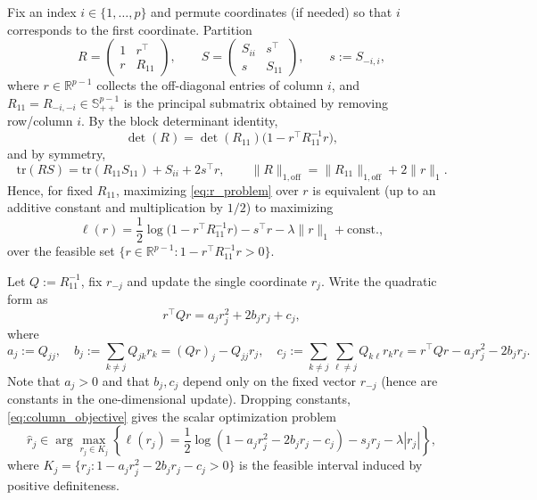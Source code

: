 \documentclass[12pt]{amsart}
\numberwithin{equation}{section}
\numberwithin{equation}{section}
\theoremstyle{plain}
\theoremstyle{definition}
\newcommand{\tr}{\mathrm{tr}}
\newcommand{\R}{\mathbb{R}}
\begin{document}
Fix an index $i\in\{1,\dots,p\}$ and permute coordinates (if needed) so that $i$ corresponds to the first coordinate.
Partition
\[
R=\begin{pmatrix}1 & r^\top\\ r & R_{11}\end{pmatrix},\qquad
S=\begin{pmatrix}S_{ii} & s^\top\\ s & S_{11}\end{pmatrix},
\qquad s:=S_{-i,i},
\]
where $r\in\mathbb{R}^{p-1}$ collects the off-diagonal entries of column $i$,
and $R_{11}=R_{-i,-i}\in\mathbb{S}^{p-1}_{++}$ is the principal submatrix obtained by removing row/column $i$.
By the block determinant identity,
\[
\det(R)=\det(R_{11})\bigl(1-r^\top R_{11}^{-1}r\bigr),
\]
and by symmetry,
\[
\tr(RS)=\tr(R_{11}S_{11})+S_{ii}+2s^\top r,\qquad
\|R\|_{1,\mathrm{off}}=\|R_{11}\|_{1,\mathrm{off}}+2\|r\|_1.
\]
Hence, for fixed $R_{11}$, maximizing \eqref{eq:r_problem} over $r$ is equivalent (up to an additive constant
and multiplication by $1/2$) to maximizing
\begin{equation}\label{eq:column_objective}
\ell(r)=\frac{1}{2}\log\bigl(1-r^\top R_{11}^{-1}r\bigr)-s^\top r-\lambda\|r\|_1+\text{const.},
\end{equation}
over the feasible set $\{r\in\R^{p-1}\colon 1-r^\top R_{11}^{-1}r>0\}$.

Let $Q:=R_{11}^{-1}$, fix $r_{-j}$ and update the single coordinate $r_j$.
Write the quadratic form as
\[
r^\top Q r = a_j r_j^2 + 2 b_j r_j + c_j,
\]
where
\[
a_j:=Q_{jj},\quad
b_j:=\sum_{k\neq j}Q_{jk}r_k = (Qr)_j - Q_{jj}r_j,\quad
c_j:=\sum_{k\neq j}\sum_{\ell\neq j}Q_{k\ell}r_k r_\ell
      = r^\top Q r - a_j r_j^2 - 2 b_j r_j.
\]
Note that $a_j>0$ and that $b_j,c_j$ depend only on the fixed vector $r_{-j}$ (hence are constants in the
one-dimensional update). Dropping constants, \eqref{eq:column_objective} gives the
scalar optimization problem
\begin{equation}\label{eq:rj}
\hat{r}_j \in \arg\max_{r_j\in K_j}
\left\{
\ell(r_j)=\frac12\log\left(1-a_j r_j^2-2b_j r_j-c_j\right)
- s_j r_j -\lambda |r_j|
\right\},
\end{equation}
where $K_j=\{r_j\colon 1-a_j r_j^2-2b_j r_j-c_j>0\}$ is the feasible interval induced by
positive definiteness.
\end{document}
